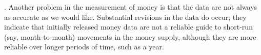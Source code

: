 \documentclass[12pt]{article}
\begin{document}
. Another problem in the measurement of money is that the data are not always as accurate as we would like. Substantial revisions in the data do occur; they indicate that initially released money data are not a reliable guide to short-run (say, month-to-month) movements in the money supply, although they are more reliable over longer periods of time, such as a year.\\

\newpage
\end{document}
